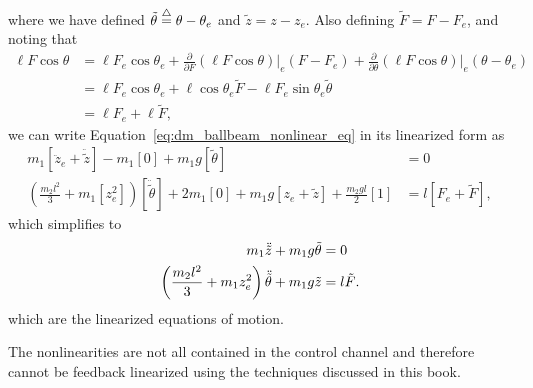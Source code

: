 where we have defined
$\tilde{\theta}\stackrel{\triangle}{=}\theta-\theta_e$ and $\tilde{z}=z-z_e$.  
%
Also defining $\tilde{F}=F-F_e$, and noting that
\begin{align*}
\ell F \cos\theta &= \ell F_e \cos\theta_e + \frac{\partial}{\partial F}(\ell F\cos\theta)\Big|_e(F-F_e) + \frac{\partial}{\partial \theta}(\ell F\cos\theta)\Big|_e(\theta-\theta_e) \\
&= \ell F_e\cos\theta_e + \ell\cos\theta_e \tilde{F} -\ell F_e\sin\theta_e\tilde{\theta} \\
&= \ell F_e + \ell \tilde{F},
\end{align*}
we can write Equation~\eqref{eq:dm_ballbeam_nonlinear_eq}
in its linearized form as
\begin{align*}
m_1 [\ddot{z}_e+\ddot{\tilde{z}}] - m_1 [0] + m_1 g [\tilde{\theta}] &= 0 
\\
\left( \frac{m_2 l^2}{3} + m_1 [z_e^2] \right) [\ddot{\tilde{\theta}}] + 2 m_1 [0] + m_1 g [z_e + \tilde{z}] + \frac{m_2 g l}{2} [1] &= l [F_e + \tilde{F}],
\end{align*}
which simplifies to
\begin{align}\label{eq:ballbeam_linearized_eom}
m_1 \ddot{\tilde{z}} + m_1 g \tilde{\theta} &= 0 \\
\left( \frac{m_2 l^2}{3} + m_1 z_e^2 \right) \ddot{\tilde{\theta}} + m_1 g \tilde{z} &= l \tilde{F}. \notag
\end{align}
which are the linearized equations of motion.

The nonlinearities are not all contained in the control channel and therefore cannot be feedback linearized using the techniques discussed in this book.

